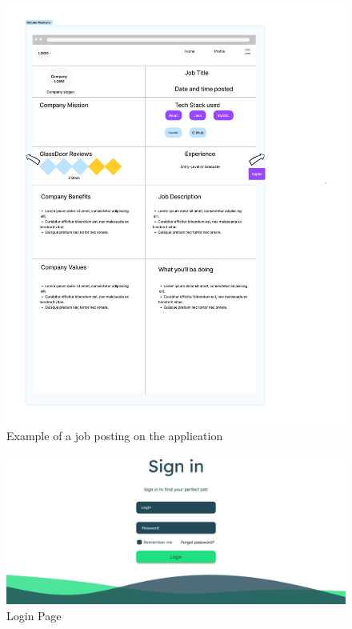 \begin{figure}
    \noindent
    \centering
    \includegraphics[width = 140mm]{Figures/posting.pdf}
    \decoRule
    \caption[Example of a job posting on the application]{Example of a job posting on the application}
    \label{fig: Job Posting}
\end{figure}

\begin{figure}
    \noindent
    \centering
    \includegraphics[width = 140mm]{Figures/loginPage.pdf}
    \decoRule
    \caption[Login Page]{Login Page}
    \label{fig: Login Page}
\end{figure}

